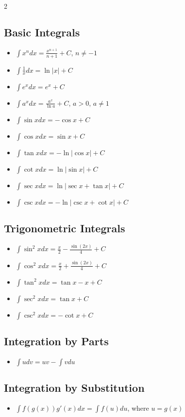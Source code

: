\begin{multicols}{2}
\subsection*{Basic Integrals}
\begin{itemize}
\item $\int x^n dx = \frac{x^{n+1}}{n+1} + C$, $n \neq -1$
\item $\int \frac{1}{x} dx = \ln|x| + C$
\item $\int e^x dx = e^x + C$
\item $\int a^x dx = \frac{a^x}{\ln a} + C$, $a > 0$, $a \neq 1$
\item $\int \sin x dx = -\cos x + C$
\item $\int \cos x dx = \sin x + C$
\item $\int \tan x dx = -\ln|\cos x| + C$
\item $\int \cot x dx = \ln|\sin x| + C$
\item $\int \sec x dx = \ln|\sec x + \tan x| + C$
\item $\int \csc x dx = -\ln|\csc x + \cot x| + C$
\end{itemize}

\subsection*{Trigonometric Integrals}
\begin{itemize}
\item $\int \sin^2 x dx = \frac{x}{2} - \frac{\sin(2x)}{4} + C$
\item $\int \cos^2 x dx = \frac{x}{2} + \frac{\sin(2x)}{4} + C$
\item $\int \tan^2 x dx = \tan x - x + C$
\item $\int \sec^2 x dx = \tan x + C$
\item $\int \csc^2 x dx = -\cot x + C$
\end{itemize}

\subsection*{Integration by Parts}
\begin{itemize}
\item $\int u dv = uv - \int v du$
\end{itemize}

\subsection*{Integration by Substitution}
\begin{itemize}
\item $\int f(g(x))g'(x)dx = \int f(u)du$, where $u = g(x)$
\end{itemize}


\end{multicols}
